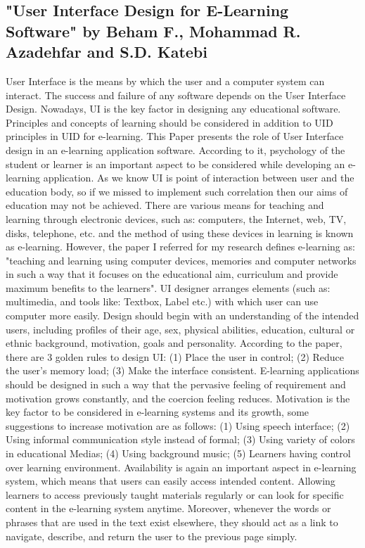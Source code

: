 \documentclass[sigchi]{acmart}
\begin{document}
		\subsection{"User Interface Design for E-Learning Software" by Beham F., Mohammad R. Azadehfar and S.D. Katebi}
			User Interface is the means by which the user and a computer system can interact. The success and failure of any software depends on the User Interface Design. Nowadays, UI is the key factor in designing any educational software. Principles and concepts of learning should be considered in addition to UID principles in UID for e-learning. 
			This Paper presents the role of User Interface design in an e-learning application software. According to it, psychology of the student or learner is an important aspect to be considered while developing an e-learning application. As we know UI is point of interaction between user and the education body, so if we missed to implement such correlation then our aims of education may not be achieved.
			There are various means for teaching and learning through electronic devices, such as: computers, the Internet, web, TV, disks, telephone, etc. and the method of using these devices in learning is known as e-learning. However, the paper I referred for my research defines e-learning as: "teaching and learning using computer devices, memories and computer networks in such a way that it focuses on the educational aim, curriculum and provide maximum benefits to the learners".
			UI designer arranges elements (such as: multimedia, and tools like: Textbox, Label etc.) with which user can use computer more easily. Design should begin with an understanding of the intended users, including profiles of their age, sex, physical abilities, education, cultural or ethnic background, motivation, goals and personality. According to the paper, there are 3 golden rules to design UI: (1) Place the user in control; (2) Reduce the user's memory load; (3) Make the interface consistent.
			E-learning applications should be designed in such a way that the pervasive feeling of requirement and motivation grows constantly, and the coercion feeling reduces. Motivation is the key factor to be considered in e-learning systems and its growth, some suggestions to increase motivation are as follows: (1) Using speech interface; (2) Using informal communication style instead of formal; (3) Using variety of colors in educational Medias; (4) Using background music; (5) Learners having control over learning environment.
			Availability is again an important aspect in e-learning system, which means that users can easily access intended content. Allowing learners to access previously taught materials regularly or can look for specific content in the e-learning system anytime. Moreover, whenever the words or phrases that are used in the text exist elsewhere, they should act as a link to navigate, describe, and return the user to the previous page simply.
\end{document}
